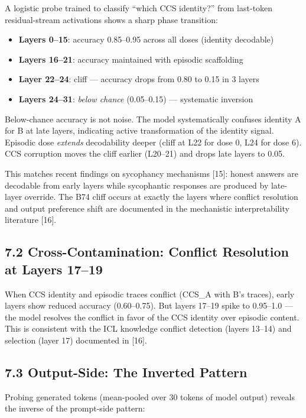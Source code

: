 \documentclass[11pt]{article}
\begin{document}
A logistic probe trained to classify ``which CCS identity?'' from last-token
residual-stream activations shows a sharp phase transition:

\begin{itemize}
\item \textbf{Layers 0--15}: accuracy 0.85--0.95 across all doses (identity decodable)
\item \textbf{Layers 16--21}: accuracy maintained with episodic scaffolding
\item \textbf{Layer 22--24}: cliff --- accuracy drops from 0.80 to 0.15 in 3 layers
\item \textbf{Layers 24--31}: \textit{below chance} (0.05--0.15) --- systematic inversion
\end{itemize}

Below-chance accuracy is not noise. The model systematically confuses identity
A for B at late layers, indicating active transformation of the identity signal.
Episodic dose \textit{extends} decodability deeper (cliff at L22 for dose 0, L24
for dose 6). CCS corruption moves the cliff earlier (L20--21) and drops late
layers to 0.05.

This matches recent findings on sycophancy mechanisms [15]: honest answers are
decodable from early layers while sycophantic responses are produced by
late-layer override. The B74 cliff occurs at exactly the layers where
conflict resolution and output preference shift are documented in the
mechanistic interpretability literature [16].

\subsection{7.2 Cross-Contamination: Conflict Resolution at Layers 17--19}

When CCS identity and episodic traces conflict (CCS\_A with B's traces),
early layers show reduced accuracy (0.60--0.75). But layers 17--19 spike
to 0.95--1.0 --- the model resolves the conflict in favor of the CCS
identity over episodic content. This is consistent with the ICL knowledge
conflict detection (layers 13--14) and selection (layer 17) documented
in [16].

\subsection{7.3 Output-Side: The Inverted Pattern}

Probing generated tokens (mean-pooled over 30 tokens of model output) reveals
the inverse of the prompt-side pattern:
\end{document}
